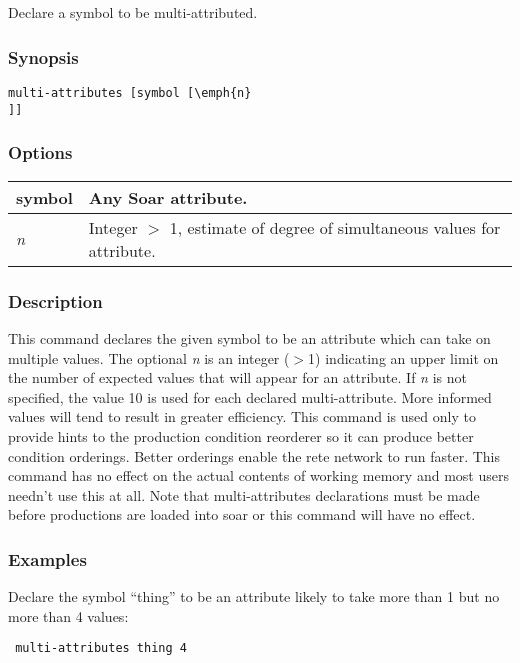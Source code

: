 \subsection{}
\label{multi-attributes}
Declare a symbol to be multi-attributed. 
\subsubsection*{Synopsis}
\begin{verbatim}
multi-attributes [symbol [\emph{n}
]] 
\end{verbatim}
\subsubsection*{Options}
\begin{tabular}{|l|l|}
\hline 
symbol & Any Soar attribute.  \\
 \hline 
\emph{n}
 & Integer $>$ 1, estimate of degree of simultaneous values for attribute.  \\
 \hline 
\end{tabular}
\subsubsection*{Description}
 This command declares the given symbol to be an attribute which can take on multiple values. The optional \emph{n}
 is an integer ($>$1) indicating an upper limit on the number of expected values that will appear for an attribute. If \emph{n}
 is not specified, the value 10 is used for each declared multi-attribute. More informed values will tend to result in greater efficiency. This command is used only to provide hints to the production condition reorderer so it can produce better condition orderings. Better orderings enable the rete network to run faster. This command has no effect on the actual contents of working memory and most users needn't use this at all. 
 Note that multi-attributes declarations must be made before productions are loaded into soar or this command will have no effect. 
\subsubsection*{Examples}
 Declare the symbol ``thing'' to be an attribute likely to take more than 1 but no more than 4 values: \begin{verbatim}
 multi-attributes thing 4 
\end{verbatim}
